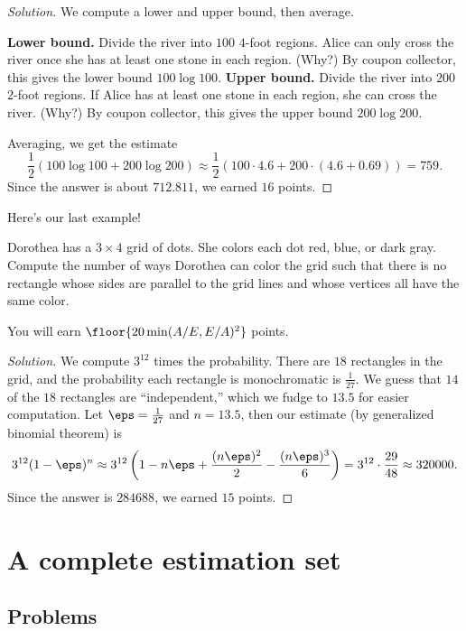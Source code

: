 \documentclass[11pt]{scrartcl}
\renewenvironment{solution}{\renewcommand\qedsymbol{$\blacksquare$}\begin{proof}[Solution]}{\end{proof}}
\begin{document}
\begin{solution}
	We compute a lower and upper bound, then average.
	\begin{itemize}
		\ii \textbf{Lower bound.} Divide the river into $100$ $4$-foot regions. Alice can only cross the river once she has at least one stone in each region. (Why?) By coupon collector, this gives the lower bound $100 \log 100$.
		\ii \textbf{Upper bound.} Divide the river into $200$ $2$-foot regions. If Alice has at least one stone in each region, she can cross the river. (Why?) By coupon collector, this gives the upper bound $200 \log 200$.
	\end{itemize}
	Averaging, we get the estimate
	\[\frac12(100 \log 100 + 200 \log 200) \approx \frac12(100 \cdot 4.6 + 200 \cdot (4.6 + 0.69)) = 759.\]
	Since the answer is about $712.811$, we earned $16$ points.
\end{solution}

Here's our last example!

\begin{example}
	Dorothea has a $3 \times 4$ grid of dots. She colors each dot red, blue, or dark gray. Compute the number of ways Dorothea can color the grid such that there is no rectangle whose sides are parallel to the grid lines and whose vertices all have the same color.

	You will earn $\floor{20\min(A/E,E/A)^2}$ points.
\end{example}

\begin{solution}
	We compute $3^{12}$ times the probability. There are $18$ rectangles in the grid, and the probability each rectangle is monochromatic is $\frac1{27}$. We guess that $14$ of the $18$ rectangles are ``independent,'' which we fudge to $13.5$ for easier computation. Let $\eps = \frac1{27}$ and $n = 13.5$, then our estimate (by generalized binomial theorem) is
	\[3^{12}(1 - \eps)^n \approx 3^{12}\left( 1 - n\eps + \frac{(n\eps)^2}2 - \frac{(n\eps)^3}{6} \right) = 3^{12} \cdot \frac{29}{48} \approx 320000.\]
	Since the answer is $284688$, we earned $15$ points.
\end{solution}

\pagebreak

\section{A complete estimation set}\label{sec:bmt_set}

\subsection{Problems}
\end{document}
